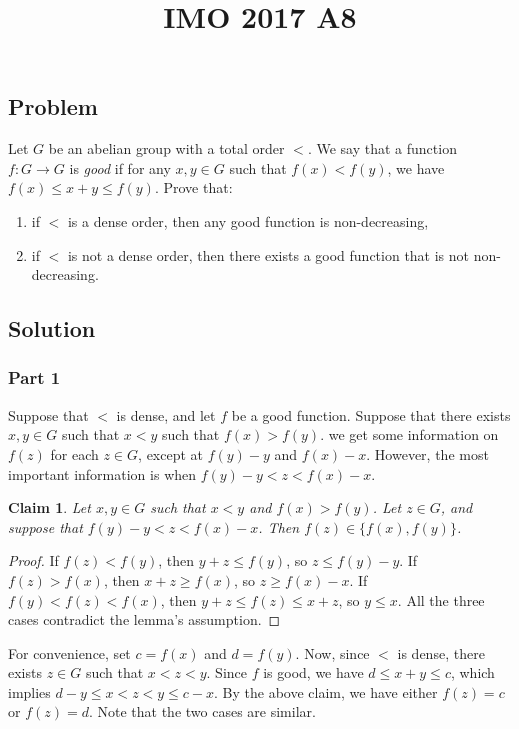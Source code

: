\documentclass{article}
\title{IMO 2017 A8}
\author{}
\date{}
\newtheorem*{claim}{Claim}
\begin{document}
\maketitle



\subsection*{Problem}

Let $G$ be an abelian group with a total order $<$.
We say that a function $f : G \to G$ is \emph{good} if for any $x, y \in G$ such that $f(x) < f(y)$, we have $f(x) \leq x + y \leq f(y)$.
Prove that:
\begin{enumerate}
    \item if $<$ is a dense order, then any good function is non-decreasing,
    \item if $<$ is not a dense order, then there exists a good function that is not non-decreasing.
\end{enumerate}


\subsection*{Solution}

\subsubsection*{Part 1}

Suppose that $<$ is dense, and let $f$ be a good function.
Suppose that there exists $x, y \in G$ such that $x < y$ such that $f(x) > f(y)$.
we get some information on $f(z)$ for each $z \in G$, except at $f(y) - y$ and $f(x) - x$.
However, the most important information is when $f(y) - y < z < f(x) - x$.

\begin{claim}
Let $x, y \in G$ such that $x < y$ and $f(x) > f(y)$.
Let $z \in G$, and suppose that $f(y) - y < z < f(x) - x$.
Then $f(z) \in \{f(x), f(y)\}$.
\end{claim}
\begin{proof}
If $f(z) < f(y)$, then $y + z \leq f(y)$, so $z \leq f(y) - y$.
If $f(z) > f(x)$, then $x + z \geq f(x)$, so $z \geq f(x) - x$.
If $f(y) < f(z) < f(x)$, then $y + z \leq f(z) \leq x + z$, so $y \leq x$.
All the three cases contradict the lemma's assumption.
\end{proof}

For convenience, set $c = f(x)$ and $d = f(y)$.
Now, since $<$ is dense, there exists $z \in G$ such that $x < z < y$.
Since $f$ is good, we have $d \leq x + y \leq c$, which implies $d - y \leq x < z < y \leq c - x$.
By the above claim, we have either $f(z) = c$ or $f(z) = d$.
Note that the two cases are similar.
\end{document}
